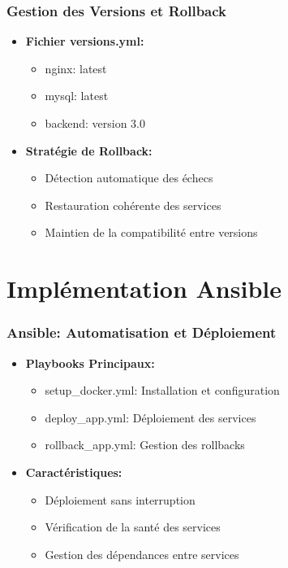 \documentclass[aspectratio=169]{beamer}
\begin{document}
\begin{frame}
    \frametitle{Gestion des Versions et Rollback}
    \begin{itemize}
        \item \textbf{Fichier versions.yml:}
        \begin{itemize}
            \item nginx: latest
            \item mysql: latest
            \item backend: version 3.0
        \end{itemize}
        \item \textbf{Stratégie de Rollback:}
        \begin{itemize}
            \item Détection automatique des échecs
            \item Restauration cohérente des services
            \item Maintien de la compatibilité entre versions
        \end{itemize}
    \end{itemize}
\end{frame}

\section{Implémentation Ansible}
\begin{frame}
    \frametitle{Ansible: Automatisation et Déploiement}
    \begin{itemize}
        \item \textbf{Playbooks Principaux:}
        \begin{itemize}
            \item setup\_docker.yml: Installation et configuration
            \item deploy\_app.yml: Déploiement des services
            \item rollback\_app.yml: Gestion des rollbacks
        \end{itemize}
        \item \textbf{Caractéristiques:}
        \begin{itemize}
            \item Déploiement sans interruption
            \item Vérification de la santé des services
            \item Gestion des dépendances entre services
        \end{itemize}
    \end{itemize}
\end{frame}
\end{document}
